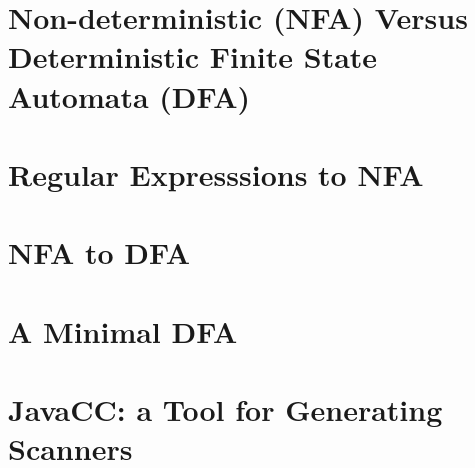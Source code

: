 \documentclass[8pt,a4paper,compress]{beamer}
\begin{document}
\section{Non-deterministic (NFA) Versus Deterministic Finite State Automata (DFA)}
\begin{frame}[fragile]
\pause

\end{frame}

\section{Regular Expresssions to NFA}
\begin{frame}[fragile]
\pause

\end{frame}

\section{NFA to DFA}
\begin{frame}[fragile]
\pause

\end{frame}

\section{A Minimal DFA}
\begin{frame}[fragile]
\pause

\end{frame}

\section{JavaCC: a Tool for Generating Scanners}
\begin{frame}[fragile]
\pause

\end{frame}
\end{document}
